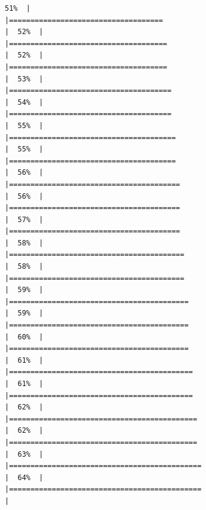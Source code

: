 \documentclass[
  english,
  man,a4paper,mask,floatsintext]{apa6}
\begin{document}
\begin{verbatim}
51%  |                                                                              |====================================                                  |  52%  |                                                                              |=====================================                                 |  52%  |                                                                              |=====================================                                 |  53%  |                                                                              |======================================                                |  54%  |                                                                              |======================================                                |  55%  |                                                                              |=======================================                               |  55%  |                                                                              |=======================================                               |  56%  |                                                                              |========================================                              |  56%  |                                                                              |========================================                              |  57%  |                                                                              |========================================                              |  58%  |                                                                              |=========================================                             |  58%  |                                                                              |=========================================                             |  59%  |                                                                              |==========================================                            |  59%  |                                                                              |==========================================                            |  60%  |                                                                              |==========================================                            |  61%  |                                                                              |===========================================                           |  61%  |                                                                              |===========================================                           |  62%  |                                                                              |============================================                          |  62%  |                                                                              |============================================                          |  63%  |                                                                              |=============================================                         |  64%  |                                                                              |=============================================                         |  
\end{verbatim}
\end{document}
